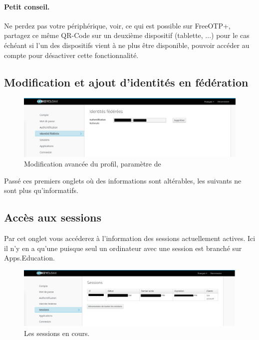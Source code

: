 \paragraph*{Petit conseil.} Ne perdez pas votre périphérique, voir, ce qui est possible sur FreeOTP+, partagez ce même QR-Code sur un deuxième dispositif (tablette, ...) pour le cas échéant si l'un des dispositifs vient à ne plus être disponible, pouvoir accéder au compte pour désactiver cette fonctionnalité.

\subsection{Modification et ajout d'identités en fédération}
\begin{figure}
	\centering
	\includegraphics{./Captures/keycloack.profil.identite.federee.png}
	\caption{Modification avancée du profil, paramètre de }
\end{figure}

Passé ces premiers onglets où des informations sont altérables, les suivants ne sont plus qu'informatifs.

\subsection{Accès aux sessions}
Par cet onglet vous accéderez à l'information des sessions actuellement actives. 
Ici il n'y en a qu'une puisque seul un ordinateur avec une session est branché sur Apps.Education.
\begin{figure}
	\centering
	\includegraphics{./Captures/keycloack.profil.sessions.png}
	\caption{Les sessions en cours.}
\end{figure}

